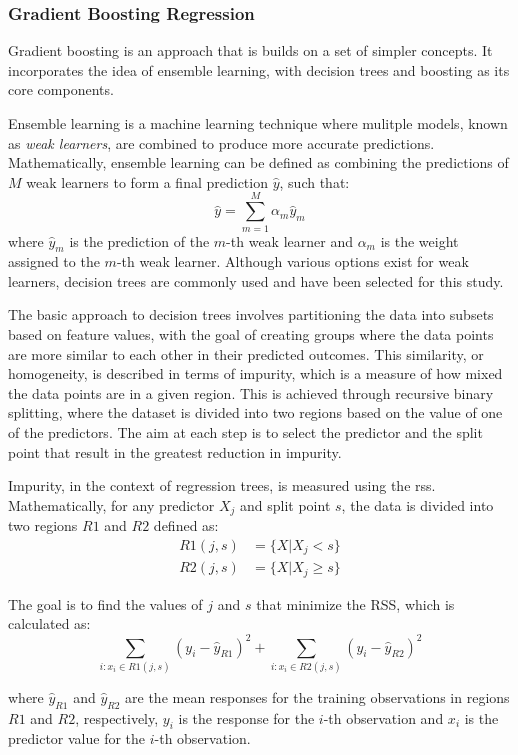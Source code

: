 \subsubsection{Gradient Boosting Regression}\label{sec:gradientboost}
Gradient boosting is an approach that is builds on a set of simpler concepts.
It incorporates the idea of ensemble learning, with decision trees and boosting as its core components. 

Ensemble learning is a machine learning technique where mulitple models, known as \textit{weak learners}, are combined to produce more accurate predictions.
Mathematically, ensemble learning can be defined as combining the predictions of $M$ weak learners to form a final prediction $\hat{y}$, such that:
\begin{equation}
    \hat{y} = \sum_{m=1}^{M} \alpha_m \hat{y}_m
\end{equation}
where $\hat{y}_m$ is the prediction of the $m$-th weak learner and $\alpha_m$ is the weight assigned to the $m$-th weak learner.
Although various options exist for weak learners, decision trees are commonly used and have been selected for this study.

The basic approach to decision trees involves partitioning the data into subsets based on feature values, with the goal of creating groups where the data points are more similar to each other in their predicted outcomes. 
This similarity, or homogeneity, is described in terms of impurity, which is a measure of how mixed the data points are in a given region. 
This is achieved through recursive binary splitting, where the dataset is divided into two regions based on the value of one of the predictors. 
The aim at each step is to select the predictor and the split point that result in the greatest reduction in impurity.

Impurity, in the context of regression trees, is measured using the \gls{rss}.
Mathematically, for any predictor $X_j$ and split point $s$, the data is divided into two regions $R1$ and $R2$ defined as:
$$
\begin{aligned}
    R1(j, s) &= \{X | X_j < s\} \\
    R2(j, s) &= \{X | X_j \geq s\}
\end{aligned}
$$

The goal is to find the values of $j$ and $s$ that minimize the RSS, which is calculated as:
$$
\sum_{i: x_i \in R1(j, s)} (y_i - \hat{y}_{R1})^2 + \sum_{i: x_i \in R2(j, s)} (y_i - \hat{y}_{R2})^2
$$

where $\hat{y}_{R1}$ and $\hat{y}_{R2}$ are the mean responses for the training observations in regions $R1$ and $R2$, respectively, $y_i$ is the response for the $i$-th observation and $x_i$ is the predictor value for the $i$-th observation. 

